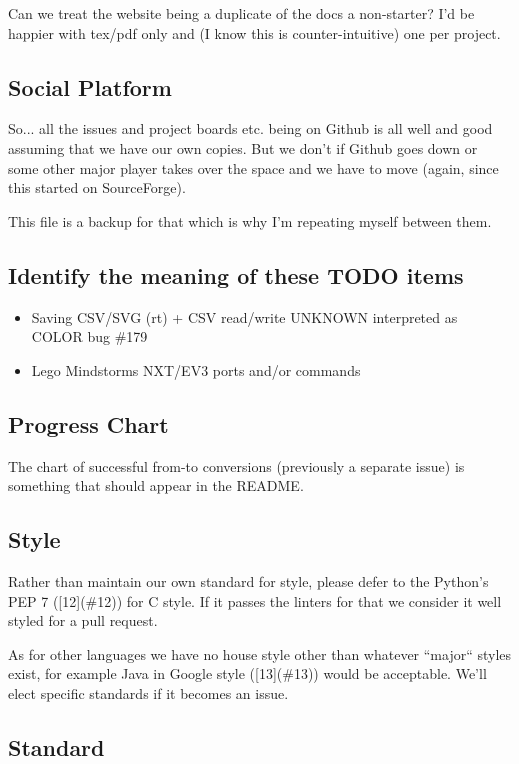 \documentclass{report}
\begin{document}
Can we treat the website being a duplicate of the docs a non-starter?
I'd be happier with tex/pdf only and (I know this is counter-intuitive)
one per project.

\subsection{Social Platform}

So... all the issues and project boards etc. being on Github is all
well and good assuming that we have our own copies. But we don't if
Github goes down or some other major player takes over the space and we
have to move (again, since this started on SourceForge).

This file is a backup for that which is why I'm repeating myself between
them.

\subsection{Identify the meaning of these TODO items}

\begin{itemize}
\item Saving CSV/SVG (rt) + CSV read/write UNKNOWN interpreted as COLOR bug \#179
\item Lego Mindstorms NXT/EV3 ports and/or commands
\end{itemize}

\subsection{Progress Chart}

The chart of successful from-to conversions (previously a separate issue)
is something that should appear in the README.

\subsection{Style}

Rather than maintain our own standard for style, please defer to
the Python's PEP 7 ([12](\#12)) for C style.
If it passes the linters for that we consider it well styled
for a pull request.

As for other languages we have no house style other than whatever
``major`` styles exist, for example Java in
Google style ([13](\#13))
would be acceptable. We'll elect specific standards if it becomes
an issue.

\subsection{Standard}
\end{document}

